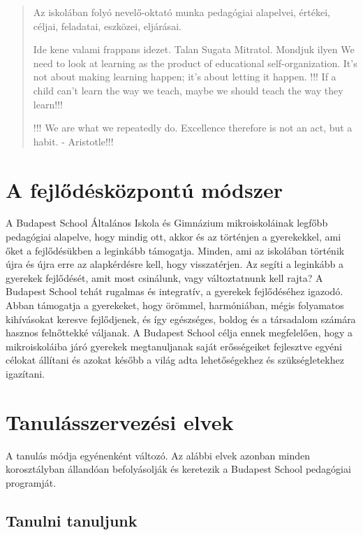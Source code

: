 \begin{quote}
      Az iskolában folyó nevelő-oktató munka pedagógiai alapelvei, értékei,
      céljai,
      feladatai, eszközei, eljárásai.

      Ide kene valami frappans idezet. Talan Sugata Mitratol. Mondjuk ilyen We
      need
      to look at learning as the product of educational self-organization. It’s
      not
      about making learning happen; it’s about letting it happen.
      !!! If a child can't learn the way we teach, maybe we should teach the
      way
      they learn!!!

      !!! We are what we repeatedly do. Excellence therefore is not an act, but
      a
      habit. - Aristotle!!!

\end{quote}


\section{A fejlődésközpontú módszer}
A Budapest School Általános Iskola és Gimnázium mikroiskoláinak legfőbb
pedagógiai alapelve, hogy mindig ott, akkor és az történjen a
gyerekekkel, ami őket a fejlődésükben a leginkább támogatja. Minden, ami
az iskolában történik újra és újra erre az alapkérdésre kell, hogy
visszatérjen. Az segíti a leginkább a gyerekek fejlődését, amit most
csinálunk, vagy változtatnunk kell rajta? A Budapest School
tehát rugalmas és integratív, a gyerekek fejlődéséhez igazodó. Abban
támogatja a gyerekeket, hogy örömmel, harmóniában, mégis folyamatos
kihívásokat keresve fejlődjenek, és így egészséges, boldog és a
társadalom számára hasznos felnőttekké váljanak. A Budapest School
célja ennek megfelelően, hogy a mikroiskoláiba járó gyerekek
megtanuljanak saját erősségeiket fejlesztve egyéni célokat állítani és
azokat később a  világ adta lehetőségekhez és szükségletekhez
igazítani.

\section{Tanulásszervezési elvek}
\label{sec:tanulasszervezesi_elvek}

A tanulás módja egyénenként változó. Az alábbi elvek azonban minden
korosztályban állandóan befolyásolják és keretezik a Budapest School
pedagógiai programját.

\subsection{Tanulni tanuljunk}

